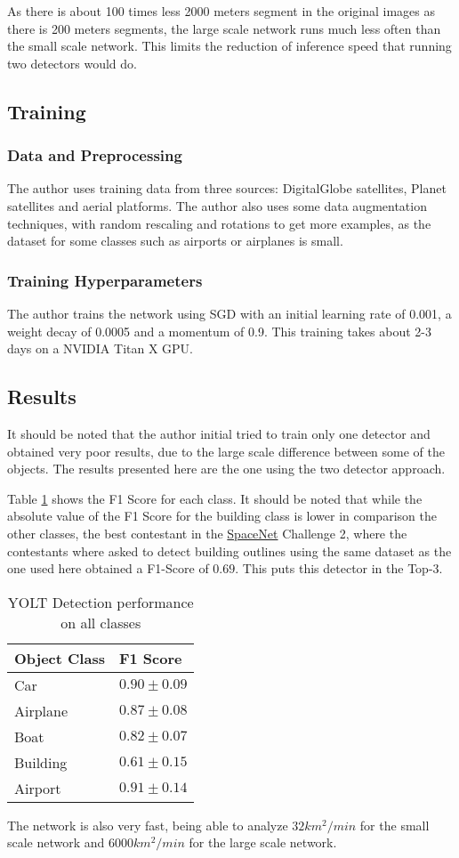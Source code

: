 As there is about 100 times less 2000 meters segment in the original images as there is 200 meters segments, the large scale network runs much less often than the small scale network. This limits the reduction of inference speed that running two detectors would do.

\subsection{Training}
\subsubsection{Data and Preprocessing}
The author uses training data from three sources: DigitalGlobe satellites, Planet satellites and aerial platforms. The author also uses some data augmentation techniques, with random rescaling and rotations to get more examples, as the dataset for some classes such as airports or airplanes is small.
 \subsubsection{Training Hyperparameters}
The author trains the network using SGD with an initial learning rate of 0.001, a weight decay of 0.0005 and a momentum of 0.9. This training takes about 2-3 days on a NVIDIA Titan X GPU.

\subsection{Results}
It should be noted that the author initial tried to train only one detector and obtained very poor results, due to the large scale difference between some of the objects. The results presented here are the one using the two detector approach.

Table \ref{tab:yoltResults} shows the F1 Score for each class. It should be noted that while the absolute value of the F1 Score for the building class is lower in comparison the other classes, the best contestant in the \href{https://spacenetchallenge.github.io/}{SpaceNet} Challenge 2, where the contestants where asked to detect building outlines using the same dataset as the one used here obtained a F1-Score of $0.69$. This puts this detector in the Top-3.
\begin{table}[h!]
\centering
\begin{tabular}{ll}
Object Class & F1 Score        \\ \hline
Car          & $0.90 \pm 0.09$ \\
Airplane     & $0.87 \pm 0.08$ \\
Boat         & $0.82 \pm 0.07$ \\
Building     & $0.61 \pm 0.15$ \\
Airport      & $0.91 \pm 0.14$ \\ \bottomrule
\end{tabular}
\caption{YOLT Detection performance on all classes}
\label{tab:yoltResults}
\end{table}

The network is also very fast, being able to analyze $32 km^2/min$ for the small scale network and $6000 km^2/min$ for the large scale network.
